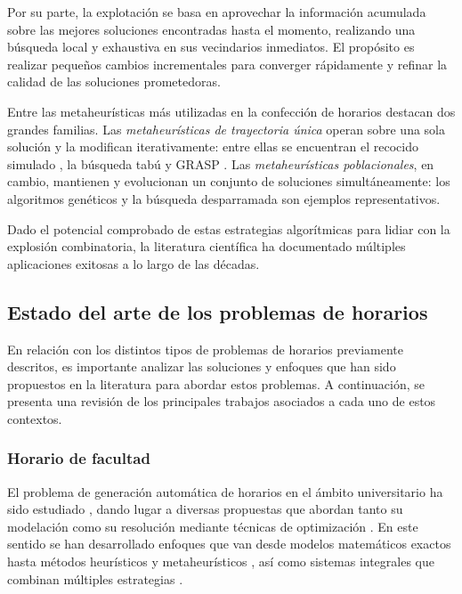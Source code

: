 \documentclass{article}
\begin{document}
Por su parte, la explotación se basa en aprovechar la información acumulada sobre las mejores soluciones encontradas hasta el momento, realizando una búsqueda local y exhaustiva en sus vecindarios inmediatos. El propósito es realizar pequeños cambios incrementales para converger rápidamente y refinar la calidad de las soluciones prometedoras.

Entre las metaheurísticas más utilizadas en la confección de horarios destacan dos grandes familias. Las \textit{metaheurísticas de trayectoria única} operan sobre una sola solución y la modifican iterativamente: entre ellas se encuentran el recocido simulado \cite{kirkpatrick1983}, la búsqueda tabú \cite{glover1997} y GRASP \cite{feo1995}. Las \textit{metaheurísticas poblacionales}, en cambio, mantienen y evolucionan un conjunto de soluciones simultáneamente: los algoritmos genéticos \cite{holland1992} y la búsqueda desparramada son ejemplos representativos.

Dado el potencial comprobado de estas estrategias algorítmicas para lidiar con la explosión combinatoria, la literatura científica ha documentado múltiples aplicaciones exitosas a lo largo de las décadas.

\subsection{Estado del arte de los problemas de horarios}
\label{sec:arte}

En relación con los distintos tipos de problemas de horarios previamente descritos, es importante analizar las soluciones y enfoques que han sido propuestos en la literatura para abordar estos problemas. A continuación, se presenta una revisión de los principales trabajos asociados a cada uno de estos contextos.


\subsubsection{Horario de facultad}

El problema de generación automática de horarios en el ámbito universitario ha sido estudiado \cite{abdennadher2000, babaei2015, bazilio2021, ong2016}, dando lugar a diversas propuestas que abordan tanto su modelación como su resolución mediante técnicas de optimización \cite{babaei2015}. En este sentido se han desarrollado enfoques que van desde modelos matemáticos exactos \cite{portela2010} hasta métodos heurísticos y metaheurísticos \cite{segui2014}, así como sistemas integrales que combinan múltiples estrategias \cite{chang2014}.
\end{document}
